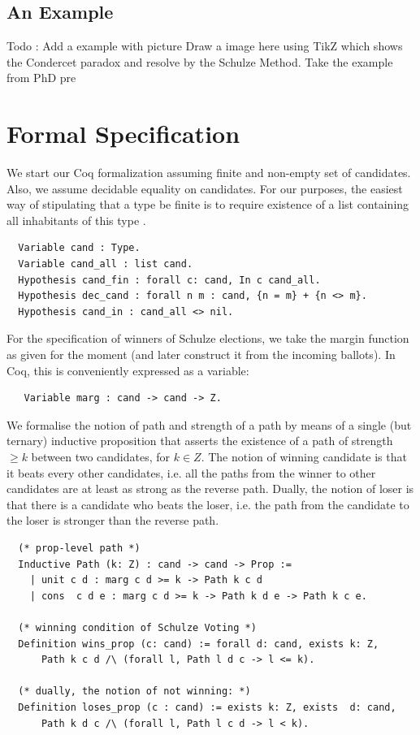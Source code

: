 	\subsection{An Example}
	 Todo : Add a example with picture
	 Draw a image here using TikZ which shows the Condercet paradox 
	 and resolve by the Schulze Method. Take the example from PhD pre
	 
	
	
\section{Formal Specification} \label{sec:spec}
	We start our Coq formalization assuming finite  and non-empty 
	set of candidates. Also, we assume decidable equality on 
	candidates. For our purposes, the
	easiest way of stipulating that a type be finite is to require
	existence of a list containing all inhabitants of this type \citep{DBLP:conf/icfp/FirsovU15}.

\begin{verbatim}
  Variable cand : Type.
  Variable cand_all : list cand.
  Hypothesis cand_fin : forall c: cand, In c cand_all.
  Hypothesis dec_cand : forall n m : cand, {n = m} + {n <> m}.
  Hypothesis cand_in : cand_all <> nil.
\end{verbatim}

\noindent
For the specification of winners of Schulze elections, we take the
margin function as given for the moment (and later construct it from
the incoming ballots). In Coq, this is conveniently expressed as a
variable:
\begin{verbatim}
   Variable marg : cand -> cand -> Z.
\end{verbatim}

\noindent
We formalise the notion of path and strength of a path by means of a
single (but ternary) inductive proposition that asserts the
existence of a path of strength $\geq k$ between two candidates, for
$k \in Z$. The notion of winning candidate is that it beats every other candidates, i.e.  all the paths from 
the winner to other candidates are at least as strong as the reverse path. Dually, the notion of loser
 is that there is a candidate who beats the loser, i.e. the path from the candidate to the loser is 
 stronger than the reverse path. 


\begin{verbatim}
  (* prop-level path *)
  Inductive Path (k: Z) : cand -> cand -> Prop :=
    | unit c d : marg c d >= k -> Path k c d
    | cons  c d e : marg c d >= k -> Path k d e -> Path k c e.
    
  (* winning condition of Schulze Voting *)
  Definition wins_prop (c: cand) := forall d: cand, exists k: Z,
      Path k c d /\ (forall l, Path l d c -> l <= k).

  (* dually, the notion of not winning: *)
  Definition loses_prop (c : cand) := exists k: Z, exists  d: cand,
      Path k d c /\ (forall l, Path l c d -> l < k).
\end{verbatim}


